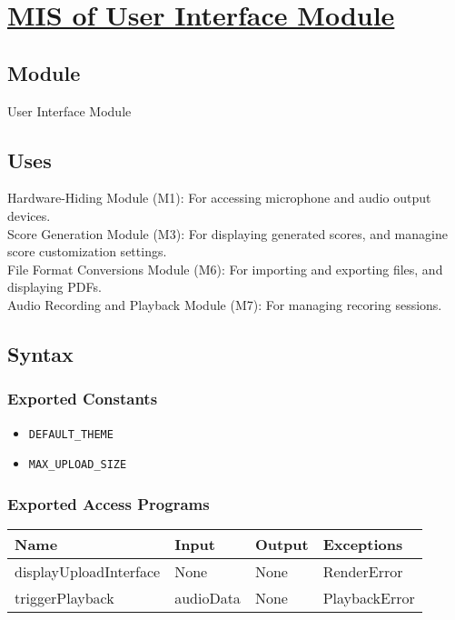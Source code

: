 \documentclass[12pt, titlepage]{article}
\begin{document}
\section{\hyperref[mUI]{MIS of User Interface Module}} \label{M2}  

\subsection{Module}  
User Interface Module  

\subsection{Uses}  
Hardware-Hiding Module (M1): For accessing microphone and audio output devices. \\
Score Generation Module (M3): For displaying generated scores, and managine score customization settings. \\
File Format Conversions Module (M6): For importing and exporting files, and displaying PDFs. \\
Audio Recording and Playback Module (M7): For managing recoring sessions. \\

\subsection{Syntax}  

\subsubsection{Exported Constants}  
\begin{itemize}
    \item \texttt{DEFAULT\_THEME}  
    \item \texttt{MAX\_UPLOAD\_SIZE}  
\end{itemize}  

\subsubsection{Exported Access Programs}  
\begin{center}  
\begin{tabular}{|p{5cm}|p{2cm}|p{4cm}|p{3.5cm}|}  
\hline  
\textbf{Name} & \textbf{Input} & \textbf{Output} & \textbf{Exceptions} \\  
\hline  
displayUploadInterface & None & None & RenderError \\  
triggerPlayback & audioData & None & PlaybackError \\  
\hline  
\end{tabular}  
\end{center}  
\end{document}
